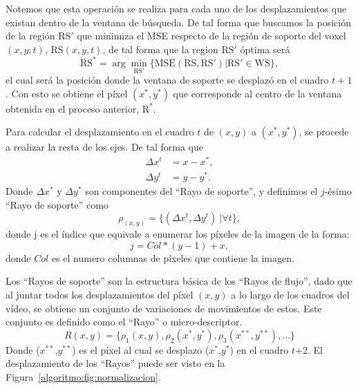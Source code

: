 	Notemos que esta operación se realiza para cada uno de los desplazamientos que existan dentro de la ventana de búsqueda. De tal forma que buscamos la posición de la región $\text{RS}'$ que minimiza el MSE respecto de la región de soporte del voxel $(x,y,t)$, $\text{RS}(x,y,t)$, de tal forma que la region $\text{RS}'$ óptima será
	\begin{equation}
		\text{RS}^* = \arg \min_{\text{RS}'}\{\text{MSE}(\text{RS},\text{RS}') | \text{RS}' \in \text{WS} \},
	\end{equation}		
	el cual será la posición donde la ventana de soporte se desplazó en el cuadro $t+1$. Con esto se obtiene el píxel $(x^*,y^*)$ que corresponde al centro de la ventana obtenida en el proceso anterior, $\text{R}^*$.
	
	Para calcular el desplazamiento en el cuadro $t$ de $(x,y)$ a $(x^*,y^*)$, se procede a realizar la resta de los ejes. De tal forma que
	\begin{align}
		\Delta x^{t} &= x-x^*,\\ 
		\Delta y^{t} &= y-y^*.
	\end{align}
		Donde $ \Delta x^*$ y $ \Delta y^*$ son componentes del ``Rayo de soporte'', y definimos el $j$-ésimo ``Rayo de soporte'' como
	\begin{equation}
		\rho_{(x,y)} = \{(\Delta x^{t}, \Delta y^{t})~| \forall t\},
	\end{equation}		
	donde j es el índice que equivale a enumerar los píxeles de la imagen de la forma:
	\begin{equation}
		j = Col*(y-1) + x,
	\end{equation}
	donde $Col$ es el numero columnas de píxeles que contiene la imagen.
	
	Los ``Rayos de soporte'' son la estructura básica de los ``Rayos de flujo'', dado que al juntar todos los desplazamientos del píxel $(x,y)$ a lo largo de los cuadros del vídeo, se obtiene un conjunto de variaciones de movimientos de estos. Este conjunto es definido como el ``Rayo'' o micro-descriptor.
	\begin{equation}
		R(x,y)	 = \{\rho_1(x,y), \rho_2(x^*,y^*), \rho_3(x^{**},y^{**}), ... \}
	\end{equation}
		Donde ($x^{**}$,$y^{**}$) es el píxel al cual se desplazo ($x^{*}$,$y^{*}$) en el cuadro $t$+2. El desplazamiento de los ``Rayos'' puede ser visto en la Figura~\ref{algoritmo:fig:normalizacion}.
		
		
